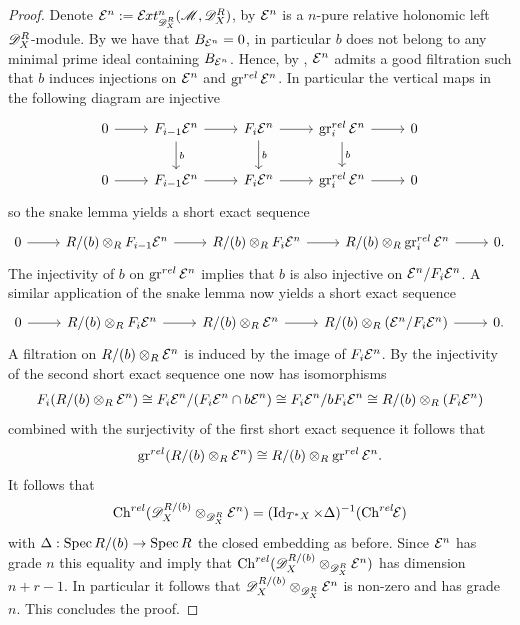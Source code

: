 \begin{proof}
  Denote $\E^n := \Ex{\D_X^R}{n}(\M,\D_X^R)$, by  $\mathcal{E}^n$ is a $n$-pure relative holonomic left $\mathscr{D}_X^R$-module.
  By  we have that $B_{\mathcal{E}^n}=0$, in particular $b$ does not belong to any minimal prime ideal containing $B_{\mathcal{E}^n}$.
  Hence, by , $\mathcal{E}^{n}$ admits a good filtration such that $b$ induces injections on $\mathcal{E}^{n}$ and $\operatorname{gr}^{rel} \mathcal{E}^{n}$.
  In particular the vertical maps in the following diagram are injective
  $$\begin{tikzcd}
    0 \arrow{r} & F_{i-1} \E^n\arrow{r} \arrow{d}{b}& F_i \E^{n}\arrow{r} \arrow{d}{b}& \gr^{rel}_i \E^n\arrow{r}\arrow{d}{b} & 0\\
    0 \arrow{r} & F_{i-1} \E^n\arrow{r} & F_i \E^{n}\arrow{r} & \gr^{rel}_i \E^n\arrow{r} & 0
  \end{tikzcd} $$
  so the snake lemma yields a short exact sequence
  $$\begin{tikzcd}
    0 \arrow{r} & R/(b)\otimes_R F_{i-1} \E^n\arrow{r} & R/(b)\otimes_R F_i \E^{n} \arrow{r} & \arrow{r}R/(b)\otimes_R \gr^{rel}_i \E^n & 0.
  \end{tikzcd} $$
  The injectivity of $b$ on $\operatorname{gr}^{rel}\mathcal{E}^n$ implies that $b$ is also injective on $\mathcal{E}^n/F_i\mathcal{E}^n$. A similar application of the snake lemma now yields a short exact sequence
  $$\begin{tikzcd}
    0 \arrow{r} &R/(b) \otimes_R F_{i} \E^n\arrow{r} & R/(b)\otimes_R \E^{n}\arrow{r} & \arrow{r} R/(b)\otimes_R(\E^n/F_i \E^n ) & 0.
  \end{tikzcd} $$
  A filtration on $R/(b) \otimes_R \mathcal{E}^n$ is induced by the image of $F_i\mathcal{E}^n$. By the injectivity of the second short exact sequence one now has isomorphisms
  \begin{align*}
    F_i( R/(b)\otimes_R\mathcal{E}^n ) \cong F_i\mathcal{E}^n / (F_i \mathcal{E}^n \cap b\mathcal{E}^n) \cong F_i \mathcal{E}^n / b F_i \mathcal{E}^n \cong   R/(b)\otimes_R (F_i\mathcal{E}^n)
  \end{align*}
  combined with the surjectivity of the first short exact sequence it follows that
  $$\operatorname{gr}^{rel}(R/(b) \otimes_R \mathcal{E}^n) \cong  R/(b)\otimes_R \operatorname{gr}^{rel}\mathcal{E}^n. $$
  It follows that
  $$\operatorname{Ch}^{rel}(\mathscr{D}_X^{R/(b)}\otimes_{\mathscr{D}_X^R} \mathcal{E}^n )  = (\operatorname{Id}_{T^*X} \times \Delta)^{-1}(\operatorname{Ch}^{rel}\mkern-5mu \mathcal{E})$$
  with $\Delta: \operatorname{Spec} R/(b) \to \operatorname{Spec} R$ the closed embedding as before.
  Since $\mathcal{E}^n$ has grade $n$ this equality and  imply that $\operatorname{Ch}^{rel}(\mathscr{D}_X^{R/(b)} \otimes_{\mathscr{D}_X^R} \mathcal{E}^n)$ has dimension $n + r - 1$.
  In particular it follows that $\mathscr{D}_X^{R/(b)} \otimes_{\mathscr{D}_X^R}\mathcal{E}^n $ is non-zero and has grade $n$. This concludes the proof.
 \end{proof}
